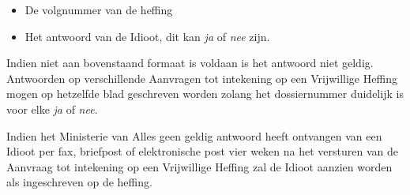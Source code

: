 \begin{itemize}
\tightlist
\item
  De volgnummer van de heffing
\item
  Het antwoord van de Idioot, dit kan \emph{ja} of \emph{nee} zijn.
\end{itemize}

Indien niet aan bovenstaand formaat is voldaan is het antwoord niet
geldig. Antwoorden op verschillende Aanvragen tot intekening op een
Vrijwillige Heffing mogen op hetzelfde blad geschreven worden zolang het
dossiernummer duidelijk is voor elke \emph{ja} of \emph{nee}.

Indien het Ministerie van Alles geen geldig antwoord heeft ontvangen van
een Idioot per fax, briefpost of elektronische post vier weken na het
versturen van de Aanvraag tot intekening op een Vrijwillige Heffing zal
de Idioot aanzien worden als ingeschreven op de heffing.
